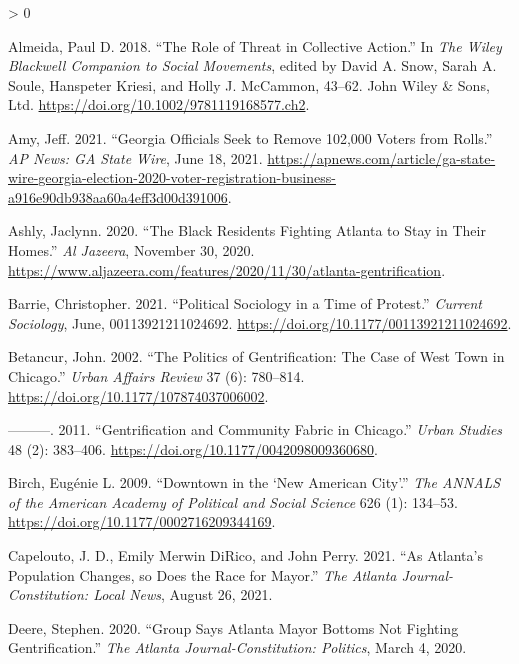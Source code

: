 \documentclass[
  12pt,
]{article}
\newlength{\cslhangindent}
\newenvironment{CSLReferences}[2] %
 {%
  \setlength{\parindent}{0pt}
  \ifodd #1 \everypar{\setlength{\hangindent}{\cslhangindent}}\ignorespaces\fi
  \ifnum #2 > 0
  \setlength{\parskip}{#2\baselineskip}
  \fi
 }%
 {}
\begin{document}
\hypertarget{refs}{}
\begin{CSLReferences}{1}{0}
\leavevmode\hypertarget{ref-Almeida2018}{}%
Almeida, Paul D. 2018. {``The {Role} of {Threat} in {Collective Action}.''} In \emph{The {Wiley Blackwell Companion} to {Social Movements}}, edited by David A. Snow, Sarah A. Soule, Hanspeter Kriesi, and Holly J. McCammon, 43--62. {John Wiley \& Sons, Ltd}. \url{https://doi.org/10.1002/9781119168577.ch2}.

\leavevmode\hypertarget{ref-Amy2021}{}%
Amy, Jeff. 2021. {``Georgia Officials Seek to Remove 102,000 Voters from Rolls.''} \emph{AP News: GA State Wire}, June 18, 2021. \url{https://apnews.com/article/ga-state-wire-georgia-election-2020-voter-registration-business-a916e90db938aa60a4eff3d00d391006}.

\leavevmode\hypertarget{ref-Ashly2020}{}%
Ashly, Jaclynn. 2020. {``The {Black} Residents Fighting {Atlanta} to Stay in Their Homes.''} \emph{Al Jazeera}, November 30, 2020. \url{https://www.aljazeera.com/features/2020/11/30/atlanta-gentrification}.

\leavevmode\hypertarget{ref-Barrie2021}{}%
Barrie, Christopher. 2021. {``Political Sociology in a Time of Protest.''} \emph{Current Sociology}, June, 00113921211024692. \url{https://doi.org/10.1177/00113921211024692}.

\leavevmode\hypertarget{ref-Betancur2002}{}%
Betancur, John. 2002. {``The {Politics} of {Gentrification}: {The Case} of {West Town} in {Chicago}.''} \emph{Urban Affairs Review} 37 (6): 780--814. \url{https://doi.org/10.1177/107874037006002}.

\leavevmode\hypertarget{ref-Betancur2011}{}%
---------. 2011. {``Gentrification and {Community Fabric} in {Chicago}.''} \emph{Urban Studies} 48 (2): 383--406. \url{https://doi.org/10.1177/0042098009360680}.

\leavevmode\hypertarget{ref-Birch2009}{}%
Birch, Eugénie L. 2009. {``Downtown in the {`{New American City}'}.''} \emph{The ANNALS of the American Academy of Political and Social Science} 626 (1): 134--53. \url{https://doi.org/10.1177/0002716209344169}.

\leavevmode\hypertarget{ref-Capelouto2021}{}%
Capelouto, J. D., Emily Merwin DiRico, and John Perry. 2021. {``As {Atlanta}'s Population Changes, so Does the Race for Mayor.''} \emph{The Atlanta Journal-Constitution: Local News}, August 26, 2021.

\leavevmode\hypertarget{ref-Deere2020}{}%
Deere, Stephen. 2020. {``Group Says {Atlanta Mayor Bottoms} Not Fighting Gentrification.''} \emph{The Atlanta Journal-Constitution: Politics}, March 4, 2020.


\end{CSLReferences}
\end{document}
